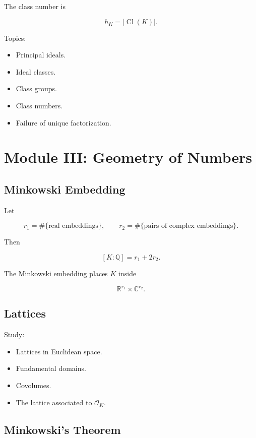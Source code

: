 \documentclass[11pt]{article}
\begin{document}
The class number is

\[
h_K=|\operatorname{Cl}(K)|.
\]

Topics:

\begin{itemize}
    \item Principal ideals.
    \item Ideal classes.
    \item Class groups.
    \item Class numbers.
    \item Failure of unique factorization.
\end{itemize}

\section{Module III: Geometry of Numbers}

\subsection{Minkowski Embedding}

Let

\[
r_1=\#\{\text{real embeddings}\},
\qquad
r_2=\#\{\text{pairs of complex embeddings}\}.
\]

Then

\[
[K:\mathbb{Q}]
=
r_1+2r_2.
\]

The Minkowski embedding places $K$ inside

\[
\mathbb{R}^{r_1}\times\mathbb{C}^{r_2}.
\]

\subsection{Lattices}

Study:

\begin{itemize}
    \item Lattices in Euclidean space.
    \item Fundamental domains.
    \item Covolumes.
    \item The lattice associated to $\mathcal{O}_K$.
\end{itemize}

\subsection{Minkowski's Theorem}
\end{document}
